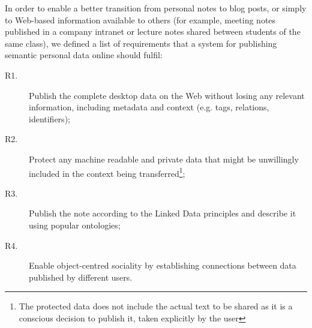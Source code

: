 In order to enable a better transition from personal notes to blog posts, or simply to Web-based information available to others (for example, meeting notes published in a company intranet or lecture notes shared between students of the same class), we defined a list of requirements that a system for publishing semantic personal data online should fulfil:
\begin{description}
 \item[R1.] Publish the complete desktop data on the Web without losing any relevant information, including metadata and context (e.g. tags, relations, identifiers);
 \item[R2.] Protect any machine readable and private data that might be unwillingly included in the context being transferred\footnote{The protected data does not include the actual text to be shared as it is a conscious decision to publish it, taken explicitly by the user};
 \item[R3.] Publish the note according to the Linked Data principles and describe it using popular ontologies; 
 \item[R4.] Enable object-centred sociality by establishing connections between data published by different users.
\end{description}
